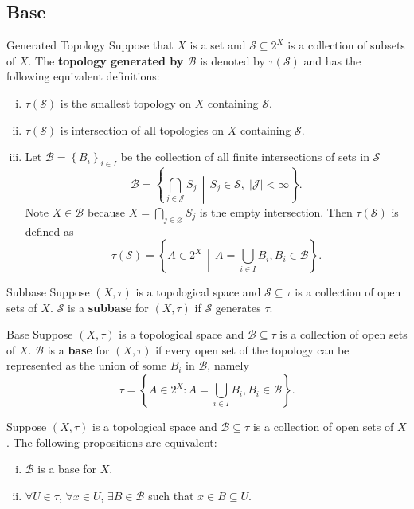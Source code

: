 \documentclass{report}
\newcommand{\midv}{\,\middle\vert\,}
\begin{document}
\subsection{Base}
\begin{definition}{Generated Topology}{}
	Suppose that $X$ is a set and $\mathcal{S}\subseteq 2^X$ is a collection of subsets of $X$. The \textbf{topology generated by $\mathcal{B}$} is denoted by $\tau(\mathcal{S})$ and has the following equivalent definitions:
	\begin{enumerate}[(i)]
		\item $\tau(\mathcal{S})$ is the smallest topology on $X$ containing $\mathcal{S}$.
		\item $\tau(\mathcal{S})$ is intersection of all topologies on $X$ containing $\mathcal{S}$.
		\item Let $\mathcal{B}=\left\{B_i\right\}_{i\in I}$ be the collection of all finite intersections of sets in $\mathcal{S}$
		      \[
			      \mathcal{B}= \left\{\bigcap_{j\in \mathcal{J}}S_j\midv S_j \in \mathcal{S},\;|\mathcal{J}|<\infty\right\}.
		      \]
		      Note $X\in \mathcal{B}$ because $X=\bigcap\limits_{j\in \varnothing}S_j$ is the empty intersection. Then $\tau(\mathcal{S})$ is defined as
		      \[
			      \tau(\mathcal{S})=\left\{A\in 2^X \midv A=\bigcup_{i\in I} B_i,B_i\in\mathcal{B}\right\}.
		      \]
	\end{enumerate}
\end{definition}

\begin{definition}{Subbase}{}
	Suppose $(X, \tau)$ is a topological space and $\mathcal{S}\subseteq \tau$ is a collection of open sets of $X$. $\mathcal{S}$ is a \textbf{subbase} for $(X,\tau)$ if $\mathcal{S}$ generates $\tau$.
\end{definition}

\begin{definition}{Base}{}
	Suppose $(X,\tau)$ is a topological space and $\mathcal{B}\subseteq \tau $ is a collection of open sets of $X$. $\mathcal{B}$ is a \textbf{base} for $(X,\tau)$ if every open set of the topology can be represented as the union of some $B_i$ in $\mathcal{B}$, namely
	\[
		\tau=\left\{A\in 2^X:A=\bigcup_{i\in I} B_i,B_i\in\mathcal{B}\right\}.
	\]
\end{definition}

\begin{proposition}{}{}
	Suppose $(X,\tau)$ is a topological space and $\mathcal{B}\subseteq \tau $ is a collection of open sets of $X$. The following propositions are equivalent:
	\begin{enumerate}[(i)]
		\item $\mathcal{B}$ is a base for $X$.
		\item $\forall U\in \tau$, $\forall x\in U$, $\exists B\in\mathcal{B}$ such that $x\in B\subseteq U$.
	\end{enumerate}
\end{proposition}
\end{document}
